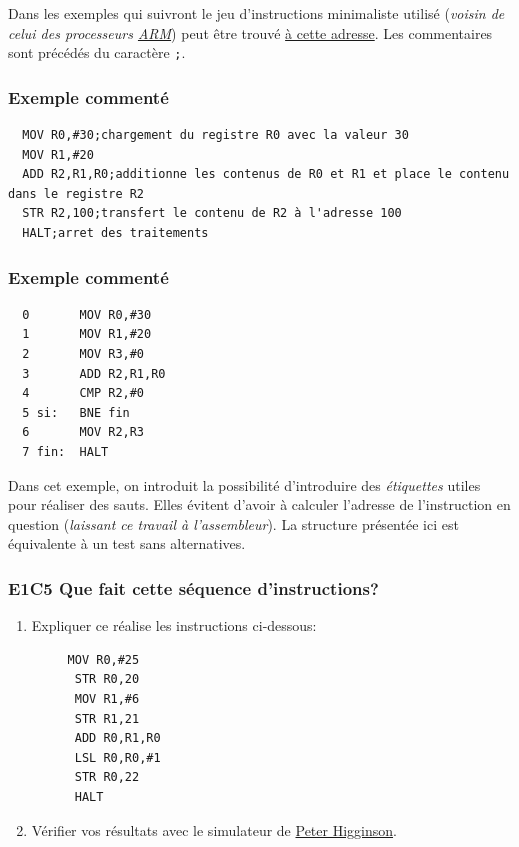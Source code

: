 \documentclass[11pt,french]{article}
\begin{document}
Dans les exemples qui suivront le jeu d'instructions minimaliste utilisé
(\textit{voisin de celui des processeurs
\href{https://fr.wikipedia.org/wiki/Architecture_ARM}{ARM}}) peut être
trouvé \href{http://www.peterhigginson.co.uk/AQA/info.html}{à cette
adresse}. Les commentaires sont précédés du caractère \texttt{;}. 

\hypertarget{exemple-1}{%
\subsubsection{Exemple commenté }\label{exemple-1}}
\begin{verbatim}
  MOV R0,#30;chargement du registre R0 avec la valeur 30
  MOV R1,#20
  ADD R2,R1,R0;additionne les contenus de R0 et R1 et place le contenu dans le registre R2
  STR R2,100;transfert le contenu de R2 à l'adresse 100
  HALT;arret des traitements
\end{verbatim}

\hypertarget{exemple-2}{%
\subsubsection{Exemple commenté }\label{exemple-2}}
\begin{verbatim}
  0       MOV R0,#30
  1       MOV R1,#20
  2       MOV R3,#0
  3       ADD R2,R1,R0
  4       CMP R2,#0
  5 si:   BNE fin
  6       MOV R2,R3
  7 fin:  HALT
\end{verbatim}
Dans cet exemple, on introduit la possibilité d'introduire des
\emph{étiquettes} utiles pour réaliser des sauts. Elles évitent d'avoir à
calculer l'adresse de l'instruction en question (\emph{laissant ce
travail à l'assembleur}). La structure présentée ici est équivalente à
un test sans alternatives.

\hypertarget{e1c5-que-fait-cette-suxe9quence-dinstructions}{%
\subsubsection{E1C5 Que fait cette séquence
d'instructions?}\label{e1c5-que-fait-cette-suxe9quence-dinstructions}}
\begin{enumerate}
\item Expliquer ce réalise les instructions ci-dessous:
	\begin{verbatim}
	 MOV R0,#25
      STR R0,20
      MOV R1,#6
      STR R1,21
      ADD R0,R1,R0
      LSL R0,R0,#1
      STR R0,22
      HALT
	\end{verbatim}
\item Vérifier vos résultats avec le simulateur de
\href{http://www.peterhigginson.co.uk/AQA/}{Peter Higginson}.
\end{enumerate}
\end{document}
